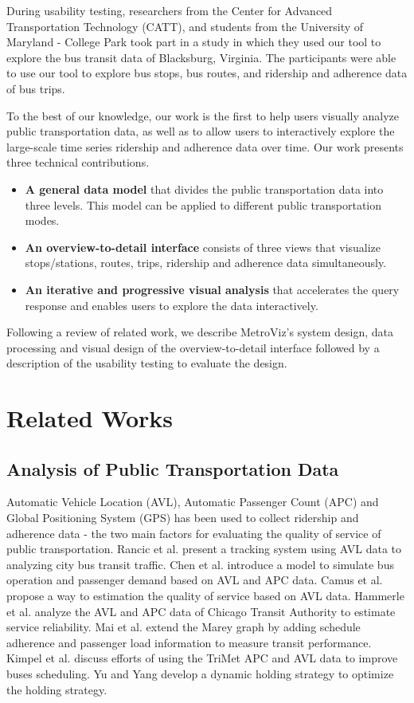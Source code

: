 \documentclass[journal]{vgtc}
\begin{document}
During usability testing, researchers from the Center for Advanced Transportation Technology (CATT), and students from the University of Maryland - College Park took part in a study in which they used our tool to explore the bus transit data of Blacksburg, Virginia. The participants were able to use our tool to explore bus stops, bus routes, and ridership and adherence data of bus trips.

To the best of our knowledge, our work is the first to help users visually analyze public transportation data, as well as to allow users to interactively explore the large-scale time series ridership and adherence data over time. Our work presents three technical contributions.


\begin{itemize}
  \item \textbf{A general data model} that divides the public transportation data into three levels. This model can be applied to different public transportation modes.
  \item \textbf{An overview-to-detail interface} consists of three views that visualize stops/stations, routes, trips, ridership and adherence data simultaneously.
  \item \textbf{An iterative and progressive visual analysis} that accelerates the query response and enables users to explore the data interactively.
\end{itemize}

Following a review of related work, we describe MetroViz's system design, data processing and visual design of the overview-to-detail interface followed by a description of the usability testing to evaluate the design.

\section{Related Works}

\subsection{Analysis of Public Transportation Data}
Automatic Vehicle Location (AVL), Automatic Passenger Count (APC) and Global Positioning System (GPS) has been used to collect ridership and adherence data - the two main factors for evaluating the quality of service of public transportation.
Rancic et al. \cite{Rancic2008} present a tracking system using AVL data to analyzing city bus transit traffic. 
Chen et al.\cite{5203406} introduce a model to simulate bus operation and passenger demand based on AVL and APC data. 
Camus et al. \cite{camus2005estimation} propose a way to estimation the quality of service based on AVL data. 
Hammerle et al. \cite{hammerle2005use} analyze the AVL and APC data of Chicago Transit Authority to estimate service reliability.
Mai et al. \cite{mai2011visualizing} extend the Marey graph by adding schedule adherence and passenger load information to measure transit performance.
Kimpel et al. \cite{4658140} discuss efforts of using the TriMet APC and AVL data to improve buses scheduling.
Yu and Yang \cite{Yu2007} develop a dynamic holding strategy to optimize the holding strategy.
\end{document}
